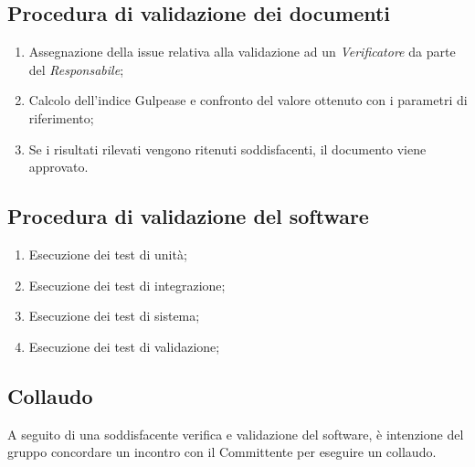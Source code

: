 \documentclass[../NormediProgetto.tex]{subfiles}
\begin{document}
\subsection{Procedura di validazione dei documenti}

\begin{enumerate}
    \item Assegnazione della issue relativa alla validazione ad un \textit{Verificatore} da parte del \textit{Responsabile};
    
    \item Calcolo dell'indice Gulpease e confronto del valore ottenuto con i parametri di riferimento;
    
    \item Se i risultati rilevati vengono ritenuti soddisfacenti, il documento viene approvato.
\end{enumerate}

\subsection{Procedura di validazione del software}

\begin{enumerate}
    \item Esecuzione dei test di unità;
    
    \item Esecuzione dei test di integrazione;
    
    \item Esecuzione dei test di sistema;
    
    \item Esecuzione dei test di validazione;
\end{enumerate}

\subsection{Collaudo}

A seguito di una soddisfacente verifica e validazione del software, è intenzione del gruppo concordare un incontro con il Committente per eseguire un collaudo.
\end{document}

